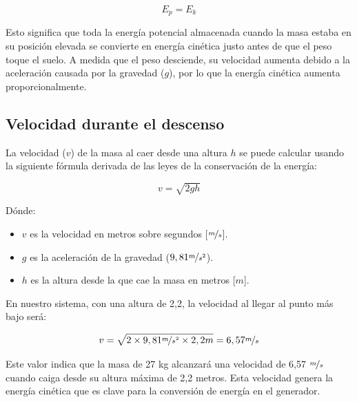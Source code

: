         \begin{equation}
            E_p = E_k
        \end{equation}

        Esto significa que toda la energía potencial almacenada cuando la masa estaba en su posición elevada se convierte en energía cinética justo antes de que el peso toque el suelo. A medida que el peso desciende, su velocidad aumenta debido a la aceleración causada por la gravedad ($g$), por lo que la energía cinética aumenta proporcionalmente.\par

        \subsection{Velocidad durante el descenso}
            La velocidad ($v$) de la masa al caer desde una altura $h$ se puede calcular usando la siguiente fórmula derivada de las leyes de la conservación de la energía:\par

            \begin{equation}
                v = \sqrt{2gh}
            \end{equation}

            Dónde:\par

            \begin{itemize} [label=•]
                \setlength{\itemindent}{1.5em}
                
                \item $v$ es la velocidad en metros sobre segundos [$\nicefrac{m}{s}$].
                \item $g$ es la aceleración de la gravedad ($9,81 \nicefrac{m}{s^2}$).
                \item $h$ es la altura desde la que cae la masa en metros [$m$].
            \end{itemize}

            En nuestro sistema, con una altura de 2,2, la velocidad al llegar al punto más bajo será:\par

            \begin{equation}
                v = \sqrt{2 \times 9,81 \nicefrac{m}{s^2} \times 2,2m} = 6,57 \nicefrac{m}{s}
            \end{equation}

            Este valor indica que la masa de 27 kg alcanzará una velocidad de 6,57 $\nicefrac{m}{s}$ cuando caiga desde su altura máxima de 2,2 metros. Esta velocidad genera la energía cinética que es clave para la conversión de energía en el generador.\par
        
